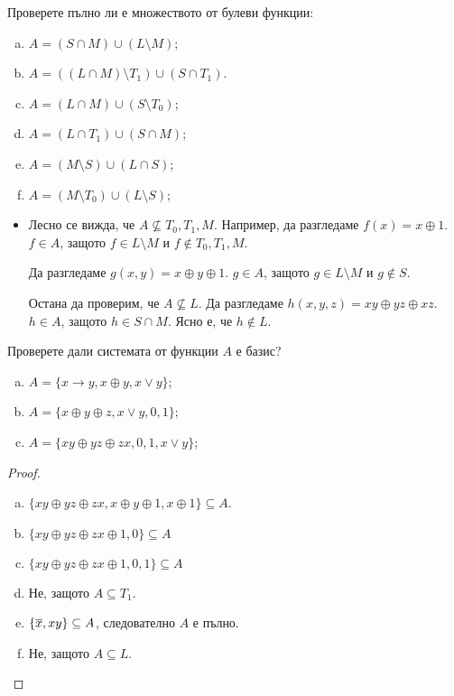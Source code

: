 \begin{problem} %
  Проверете пълно ли е множеството от булеви функции:
  \begin{enumerate}[a)]
  \item
    $A = (S\cap M)\cup(L\setminus M)$;
  \item
    $A = ((L\cap M)\setminus T_1)\cup (S\cap T_1)$.
  \item
    $A = (L\cap M)\cup (S\setminus T_0)$;
  \item
    $A = (L\cap T_1)\cup (S\cap M)$;
  \item
    $A = (M\setminus S)\cup(L\cap S)$;
  \item
    $A = (M\setminus T_0)\cup (L\setminus S)$;
  \end{enumerate}
\end{problem}
\begin{solution}
  \begin{itemize}[a)]
  \item 
    Лесно се вижда, че $A \not\subseteq T_0, T_1, M$.
    Например, да разгледаме $f(x) = x \oplus 1$.
    $f \in A$, защото $f \in L \setminus M$ и $f \not\in T_0, T_1, M$.

    Да разгледаме $g(x,y) = x\oplus y \oplus 1$.
    $g \in A$, защото $g \in L\setminus M$ и $g \not\in S$.

    Остана да проверим, че $A \not\subseteq L$.
    Да разгледаме $h(x,y,z) = xy\oplus yz \oplus xz$.
    $h \in A$, защото $h \in S\cap M$.
    Ясно е, че $h \not\in L$.
  \end{itemize}
\end{solution}

\begin{problem}
  Проверете дали системата от функции $A$ е базис?
  \begin{enumerate}[a)]
  \item
    $A = \{x\rightarrow y, x\oplus y, x\vee y\}$;
  \item
    $A = \{x\oplus y\oplus z, x\vee y, 0, 1\}$;
  \item
    $A = \{xy\oplus yz\oplus zx, 0, 1, x\vee y\}$;
  \end{enumerate}
\end{problem}
\begin{proof}
  \begin{enumerate}[a)]
  \item
    $\{xy\oplus yz\oplus zx, x\oplus y\oplus 1, x\oplus 1\} \subseteq A$.
  \item
    $\{xy\oplus yz\oplus zx\oplus 1, 0\} \subseteq A$
  \item
    $\{xy\oplus yz\oplus zx\oplus 1, 0, 1\} \subseteq A$
  \item
    Не, защото $A \subseteq T_1$.
  \item
    $\{\overline{x}, xy\} \subseteq A$, следователно $A$ е пълно.
  \item
    Не, защото $A\subseteq L$.
  \end{enumerate}
\end{proof}

